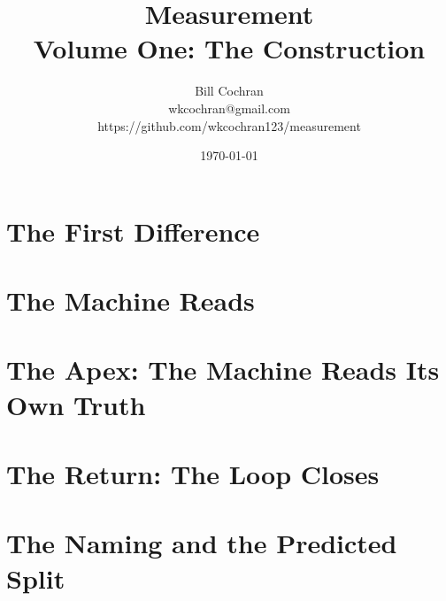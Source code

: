 \documentclass[12pt,oneside]{book}
\begin{document}
\title{Measurement\\[0.4em]\large Volume One: The Construction}
\author{Bill Cochran\\wkcochran@gmail.com\\https://github.com/wkcochran123/measurement}
\date{\today}
\maketitle

\frontmatter
\onehalfspacing
\tableofcontents





\mainmatter

\part{The First Difference}





\part{The Machine Reads}





\part{The Apex: The Machine Reads Its Own Truth}





\part{The Return: The Loop Closes}





\part{The Naming and the Predicted Split}




\end{document}
